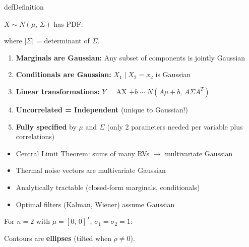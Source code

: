 \begin{PSbox}[unbreakable]{def}{Definition}

$X \sim N(\mu,\, \Sigma)$ has PDF:


where $\lvert \Sigma\rvert$ = determinant of $\Sigma$.

\end{PSbox}


\begin{enumerate}
\def\labelenumi{\arabic{enumi}.}
\tightlist
\item
  \textbf{Marginals are Gaussian:} Any subset of components is jointly Gaussian
\item
  \textbf{Conditionals are Gaussian:} $X_{1} \mid X_{2} = x_{2}$ is Gaussian
\item
  \textbf{Linear transformations:} $Y$ = AX $+ b \sim N(A\mu +b,\, A\Sigma A^{T})$
\item
  \textbf{Uncorrelated = Independent} (unique to Gaussian!)
\item
  \textbf{Fully specified} by $\mu$ and $\Sigma$ (only 2 parameters needed per variable plus correlations)
\end{enumerate}


\begin{itemize}
\tightlist
\item
  Central Limit Theorem: sums of many RVs \ensuremath{\to} multivariate Gaussian
\item
  Thermal noise vectors are multivariate Gaussian
\item
  Analytically tractable (closed-form marginals, conditionals)
\item
  Optimal filters (Kalman, Wiener) assume Gaussian
\end{itemize}


For $n = 2$ with $\mu = [0,\,0]^{T},\, \sigma_{1} = \sigma_{2} = 1$:


Contours are \textbf{ellipses} (tilted when $\rho \ne 0$).

